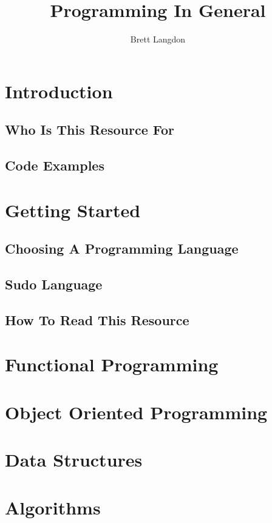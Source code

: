 \documentclass[10pt,a4paper,titlepage]{book}
\author{Brett Langdon}
\title{Programming In General}
\begin{document}
\maketitle
\tableofcontents

\chapter{Introduction}


\section{Who Is This Resource For}


\section{Code Examples}


\chapter{Getting Started}


\section{Choosing A Programming Language}


\section{Sudo Language}


\section{How To Read This Resource}


\chapter{Functional Programming}


\chapter{Object Oriented Programming}


\chapter{Data Structures}


\chapter{Algorithms}

\end{document}
